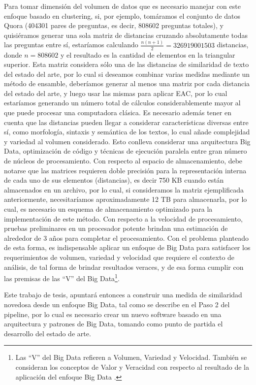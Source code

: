 \bigskip Para tomar dimensión del volumen de datos que es necesario manejar con este enfoque basado en clustering, si, por ejemplo, tomáramos el conjunto de datos Quora (404301 pares de preguntas, es decir, 808602 preguntas totales), y quisiéramos generar una sola matriz de distancias cruzando absolutamente todas las preguntas entre sí, estaríamos calculando $\frac{n(n+1)}{2} = 326919001503$ distancias, donde $n = 808602$ y el resultado es la cantidad de elementos en la triangular superior. Esta matriz considera sólo una de las distancias de similaridad de texto del estado del arte, por lo cual si deseamos combinar varias medidas mediante un método de ensamble, deberíamos generar al menos una matriz por cada distancia del estado del arte, y luego usar las mismas para aplicar EAC, por lo cual estaríamos generando un número total de cálculos considerablemente mayor al que puede procesar una computadora clásica. Es necesario además tener en cuenta que las distancias pueden llegar a considerar características diversas entre sí, como morfología, sintaxis y semántica de los textos, lo cual añade complejidad y variedad al volumen considerado. Esto conlleva considerar una arquitectura Big Data, optimización de código y técnicas de ejecución paralela entre gran número de núcleos de procesamiento. Con respecto al espacio de almacenamiento, debe notarse que las matrices requieren doble precisión para la representación interna de cada uno de sus elementos (distancias), es decir 750 KB cuando están almacenados en un archivo, por lo cual, si consideramos la matriz ejemplificada anteriormente, necesitaríamos aproximadamente 12 TB para almacenarla, por lo cual, es necesario un esquema de almacenamiento optimizado para la implementación de este método. Con respecto a la velocidad de procesamiento, pruebas preliminares en un procesador potente brindan una estimación de alrededor de 3 años para completar el procesamiento. Con el problema planteado de esta forma, es indispensable aplicar un enfoque de Big Data para satisfacer los requerimientos de volumen, variedad y velocidad que requiere el contexto de análisis, de tal forma de brindar resultados veraces, y de esa forma cumplir con las premisas de las “V” del Big Data\footnote{Las “V” del Big Data refieren a Volumen, Variedad y Velocidad. También se consideran los conceptos de Valor y Veracidad con respecto al resultado de la aplicación del enfoque Big Data \citep{gandomi2015beyond}.}. 

\bigskip Este trabajo de tesis, apuntará entonces a construir una medida de similaridad novedosa desde un enfoque Big Data, tal como se describe en el Paso 2 del pipeline, por lo cual es necesario crear un nuevo software basado en una arquitectura y patrones de Big Data, tomando como punto de partida el desarrollo del estado de arte. 


